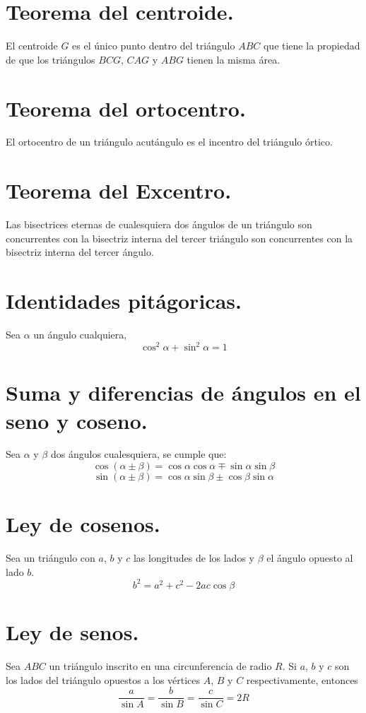 \documentclass[12pt,a4paper,oneside]{book}
\begin{document}
\section{Teorema del centroide.}
El centroide $G$ es el único punto dentro del triángulo $ABC$ que tiene la propiedad de que los triángulos $BCG$, $CAG$ y $ABG$ tienen la misma área.
\section{Teorema del ortocentro.}
El ortocentro de un triángulo acutángulo es el incentro del triángulo órtico.
\section{Teorema del Excentro.}
Las bisectrices eternas de cualesquiera dos ángulos de un triángulo son concurrentes con la bisectriz interna del tercer triángulo son concurrentes con la bisectriz interna del tercer ángulo.
\section{Identidades pitágoricas.}
Sea $\alpha$ un ángulo cualquiera,$$\cos^ 2 \alpha + \sin ^2 \alpha =1$$
\section{Suma y diferencias de ángulos en el seno y coseno.}
Sea $\alpha$ y $\beta$ dos ángulos cualesquiera, se cumple que:$$\cos ( \alpha \pm \beta) = \cos \alpha \cos \alpha \mp \sin \alpha \sin \beta$$
$$\sin (\alpha \pm \beta) = \cos \alpha \sin \beta \pm \cos \beta \sin \alpha$$
\section{Ley de cosenos.}
Sea un triángulo con $a$, $b$ y $c$ las longitudes de los lados y $\beta$ el ángulo opuesto al lado $b$.
$$b^2 = a^2 + c^2 -2ac \cos \beta$$
\section{Ley de senos.}
Sea $ABC$ un triángulo inscrito en una circunferencia de radio $R$. Si $a$, $b$ y $c$ son los lados del triángulo opuestos a los vértices $A$, $B$ y $C$ respectivamente, entonces$$ \dfrac{a}{\sin A} = \dfrac{b}{\sin B}= \dfrac{c}{\sin C}= 2R$$
\end{document}
